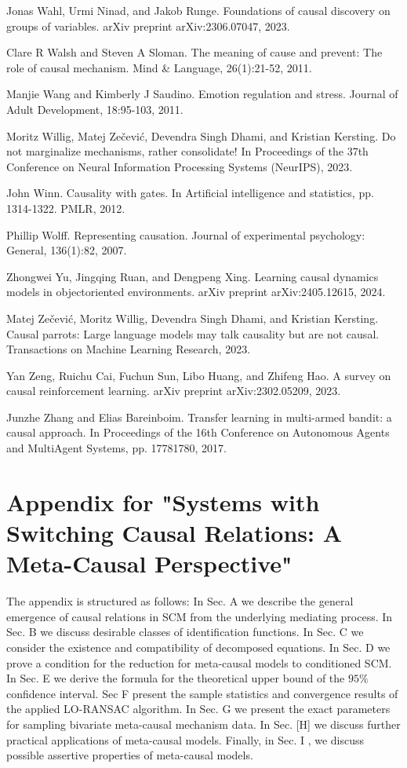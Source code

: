 \documentclass[10pt]{article}
\begin{document}
Jonas Wahl, Urmi Ninad, and Jakob Runge. Foundations of causal discovery on groups of variables. arXiv preprint arXiv:2306.07047, 2023.

Clare R Walsh and Steven A Sloman. The meaning of cause and prevent: The role of causal mechanism. Mind \& Language, 26(1):21-52, 2011.

Manjie Wang and Kimberly J Saudino. Emotion regulation and stress. Journal of Adult Development, 18:95-103, 2011.

Moritz Willig, Matej Zečević, Devendra Singh Dhami, and Kristian Kersting. Do not marginalize mechanisms, rather consolidate! In Proceedings of the 37th Conference on Neural Information Processing Systems (NeurIPS), 2023.

John Winn. Causality with gates. In Artificial intelligence and statistics, pp. 1314-1322. PMLR, 2012.

Phillip Wolff. Representing causation. Journal of experimental psychology: General, 136(1):82, 2007.

Zhongwei Yu, Jingqing Ruan, and Dengpeng Xing. Learning causal dynamics models in objectoriented environments. arXiv preprint arXiv:2405.12615, 2024.

Matej Zečević, Moritz Willig, Devendra Singh Dhami, and Kristian Kersting. Causal parrots: Large language models may talk causality but are not causal. Transactions on Machine Learning Research, 2023.

Yan Zeng, Ruichu Cai, Fuchun Sun, Libo Huang, and Zhifeng Hao. A survey on causal reinforcement learning. arXiv preprint arXiv:2302.05209, 2023.

Junzhe Zhang and Elias Bareinboim. Transfer learning in multi-armed bandit: a causal approach. In Proceedings of the 16th Conference on Autonomous Agents and MultiAgent Systems, pp. 17781780, 2017.

\section*{Appendix for "Systems with Switching Causal Relations: A Meta-Causal Perspective"}
The appendix is structured as follows: In Sec. A we describe the general emergence of causal relations in SCM from the underlying mediating process. In Sec. B we discuss desirable classes of identification functions. In Sec. C we consider the existence and compatibility of decomposed equations. In Sec. D we prove a condition for the reduction for meta-causal models to conditioned SCM. In Sec. E we derive the formula for the theoretical upper bound of the $95 \%$ confidence interval. Sec F present the sample statistics and convergence results of the applied LO-RANSAC algorithm. In Sec. G we present the exact parameters for sampling bivariate meta-causal mechanism data. In Sec. [H] we discuss further practical applications of meta-causal models. Finally, in Sec. I , we discuss possible assertive properties of meta-causal models.
\end{document}
